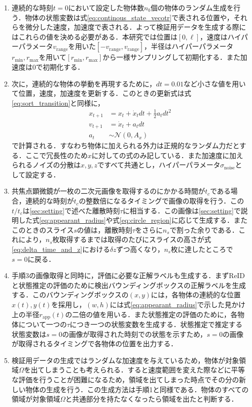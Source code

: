 \begin{enumerate}[label=手順\arabic*]
    \item 連続的な時刻$t=0$において設定した物体数$n_b$個の物体のランダム生成を行う．物体の状態変数は式\ref{eq:continous_state_vecotr}で表される位置や，それらを微分した速度，加速度で表される．よって検証用データを生成する際にはこれらの値を決める必要がある．本研究では位置は$[0, \ell]$，速度はハイパーパラメータ$v_{\text{range}}$を用いた$[-v_{\text{range}}, v_{\text{range}}]$，半径はハイパーパラメータ$r_{\text{min}}, r_{\text{max}}$を用いて$[r_{\text{min}}, r_{\text{max}}]$から一様サンプリングして初期化する．また加速度は$0$で初期化する．
    \item 次に，連続的な物体の挙動を再現するために，$dt=0.01$など小さな値を用いて位置，速度，加速度を更新する．このときの更新式は式\ref{eq:sort_transition}と同様に，
    \begin{equation}
        \label{eq:transition}
        \begin{aligned}
            x_{t+1} &= x_t + \dot{x}_t dt + \frac{1}{2} a_t dt^2
            \\v_{t+1} &= \dot{x}_t + a_t dt
            \\a_t &\sim \mathcal{N}(0, A_x)
        \end{aligned}
    \end{equation}
    で計算される．すなわち物体に加えられる外力は正規的なランダム力だとする．ここで冗長性のため$x$に対しての式のみ記している．また加速度に加えられるノイズの分散は$x, y, z$ですべて共通とし，ハイパーパラメータ$\sigma_{\text{noise}}$として設定する．
    \item 共焦点顕微鏡が一枚の二次元画像を取得するのにかかる時間が$t_c$である場合，連続的な時刻が$t_c$の整数倍になるタイミングで画像の取得を行う．この$t / t_c$は\ref{sec:setting}で述べた離散時刻$\tau$に相当する．この画像は\ref{sec:setting}で説明した式\ref{eq:appearant_radius}や式\ref{eq:circle_region}に応じて生成する．またこのときのスライス$s$の値は，離散時刻$\tau$をさらに$n_s$で割った余りである．これにより，$n_s$枚取得するまでは取得のたびにスライスの高さが式\ref{eq:delta_time_and_z}における$\delta z$ずつ高くなり，$n_s$枚に達したところで$s = 0$に戻る．
    \item 手順3の画像取得と同時に，評価に必要な正解ラベルも生成する．まずReIDと状態推定の評価のために検出バウンディングボックスの正解ラベルを生成する．このバウンディングボックスの$(x, y)$には，各物体の連続的な位置$x(t), y(t)$を採用し，$(w, h)$には式\ref{eq:appearant_radius}で示した見かけ上の半径$r_{\text{app}}(t)$の二倍の値を用いる．また状態推定の評価のために，各物体について一つの$\tau$につき一つの状態変数を生成する．状態推定で推定する状態変数は$s = 0$の画像が取得された時刻での状態を示すため，$s = 0$の画像が取得されるタイミングで各物体の位置を出力する．
    \item 検証用データの生成ではランダムな加速度を与えているため，物体が対象領域$\Omega$を出てしまうことも考えられる．すると速度範囲を変えた際などに平等な評価を行うことが困難になるため，領域を出てしまった時点でその分の新しい物体の生成を行う．この生成方法は手順1と同様である．物体のすべての領域が対象領域$\Omega$と共通部分を持たなくなったら領域を出たと判断する．
\end{enumerate}

